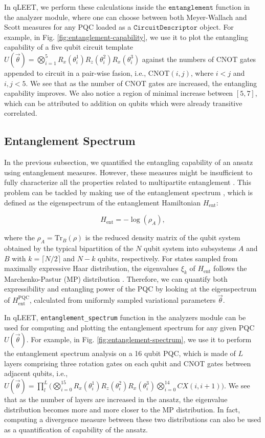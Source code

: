 \documentclass[%
 reprint,
 amsmath,
 amssymb,
 showkeys,
 pra,
 floatfix,
]{revtex4-2}
\begin{document}
In qLEET, we perform these calculations inside the $\texttt{entanglement}$ function in the analyzer module, where one can choose between both Meyer-Wallach and Scott measures for any PQC loaded as a $\texttt{CircuitDescriptor}$ object. For example, in Fig. \ref{fig:entanglement-capability}, we use it to plot the entangling capability of a five qubit circuit template $U(\vec{\theta}) = \bigotimes_{i=1}^{5}R_x(\theta_i^1)R_z(\theta_i^2)R_x(\theta_i^3)$ against the numbers of CNOT gates appended to circuit in a pair-wise fasion, i.e., CNOT$(i, j)$, where $i < j$ and $i,j <5$. We see that as the number of CNOT gates are increased, the entangling capability improves. We also notice a region of minimal increase between $[5, 7]$, which can be attributed to addition on qubits which were already transitive correlated.

\subsection{Entanglement Spectrum}

In the previous subsection, we quantified the entangling capability of an ansatz using entanglement measures. However, these measures might be insufficient to fully characterize all the properties related to multipartite entanglement \cite{PhysRevLett.115.267206}. This problem can be tackled by making use of the entanglement spectrum  \cite{PRXQuantum.1.020319}, which is defined as the eigenspectrum of the entanglement Hamiltonian $H_{\text{ent}}$:

\begin{equation}
    H_{\text{ent}} = -\log (\rho_A),
\end{equation}

where the $\rho_A = \text{Tr}_B(\rho)$ is the reduced density matrix of the qubit system obtained by the typical bipartition of the $N$ qubit system into subsystems $A$ and $B$ with $k = \lceil N/2 \rceil$ and $N-k$ qubits, respectively. For states sampled from maximally expressive Haar distribution, the eigenvalues $\xi_k$ of $H_{\text{ent}}$ follows the Marchenko-Pastur (MP) distribution \cite{10.1088/1751-8113/40/3/f04}. Therefore, we can quantify both expressibility and entangling power of the PQC by looking at the eigenspectrum of $H_{\text{ent}}^{\text{PQC}}$, calculated from uniformly sampled variational parameters $\vec{\theta}$. 

In qLEET, \texttt{entanglement\_spectrum} function in the analyzers module can be used for computing and plotting the entanglement spectrum for any given PQC $U(\vec{\theta})$. For example, in Fig. \ref{fig:entanglement-spectrum}, we use it to perform the entanglement spectrum analysis on a 16 qubit PQC, which is made of $L$ layers comprising three rotation gates on each qubit and CNOT gates between adjacent qubits, i.e., $U(\vec{\theta}) = \prod_{l}^{L}\big(\bigotimes_{i=0}^{15}R_x(\theta_i^1)R_z(\theta_i^2)R_x(\theta_i^3)\bigotimes_{i=0}^{14}CX(i, i+1)\big)$. We see that as the number of layers are increased in the ansatz, the eigenvalue distribution becomes more and more closer to the MP distribution. In fact, computing a divergence measure between these two distributions can also be used as a quantification of capability of the ansatz. 
\end{document}

